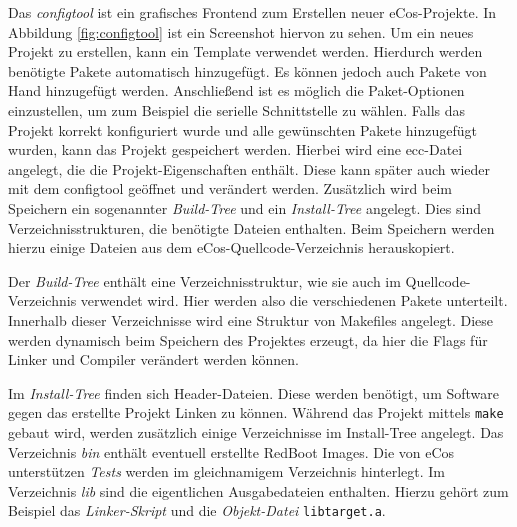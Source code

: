 \documentclass[
  a4paper,					%
  twoside,
  DIV=calc,     				%
  bibliography=totoc,
  cleardoublepage=empty,
  ngerman,     					%
  final       					%
]{scrbook}
\begin{document}
Das \emph{configtool} ist ein grafisches Frontend zum Erstellen neuer eCos-Projekte. In Abbildung \ref{fig:configtool} ist ein Screenshot hiervon zu sehen. Um ein neues Projekt zu erstellen, kann ein Template verwendet werden. Hierdurch werden benötigte Pakete automatisch hinzugefügt. Es können jedoch auch Pakete von Hand hinzugefügt werden. Anschließend ist es möglich die Paket-Optionen einzustellen, um zum Beispiel die serielle Schnittstelle zu wählen. Falls das Projekt korrekt konfiguriert wurde und alle gewünschten Pakete hinzugefügt wurden, kann das Projekt gespeichert werden. Hierbei wird eine ecc-Datei angelegt, die die Projekt-Eigenschaften enthält. Diese kann später auch wieder mit dem configtool geöffnet und verändert werden. Zusätzlich wird beim Speichern ein sogenannter \emph{Build-Tree} und ein \emph{Install-Tree} angelegt. Dies sind Verzeichnisstrukturen, die benötigte Dateien enthalten. Beim Speichern werden hierzu einige Dateien aus dem eCos-Quellcode-Verzeichnis herauskopiert. 

Der \emph{Build-Tree} enthält eine Verzeichnisstruktur, wie sie auch im Quellcode-Verzeichnis verwendet wird. Hier werden also die verschiedenen Pakete unterteilt. Innerhalb dieser Verzeichnisse wird eine Struktur von Makefiles angelegt. Diese werden dynamisch beim Speichern des Projektes erzeugt, da hier die Flags für Linker und Compiler verändert werden können.

Im \emph{Install-Tree} finden sich Header-Dateien. Diese werden benötigt, um Software gegen das erstellte Projekt Linken zu können. Während das Projekt mittels \texttt{make} gebaut wird, werden zusätzlich einige Verzeichnisse im Install-Tree angelegt. Das Verzeichnis \emph{bin} enthält eventuell erstellte RedBoot Images. Die von eCos unterstützen \emph{Tests} werden im gleichnamigem Verzeichnis hinterlegt. Im Verzeichnis \emph{lib} sind die eigentlichen Ausgabedateien enthalten. Hierzu gehört zum Beispiel das \emph{Linker-Skript} und die \emph{Objekt-Datei} \texttt{libtarget.a}.
\end{document}
